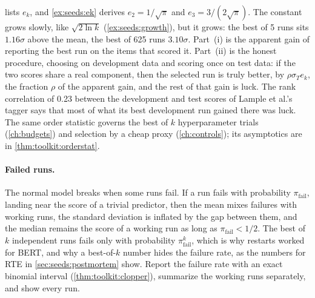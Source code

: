 \begin{refsection}
 lists $e_k$, and \cref{ex:seeds:ek} derives $e_2=1/\sqrt\pi$ and $e_3=3/(2\sqrt\pi)$. The constant grows slowly, like $\sqrt{2\ln k}$ (\cref{ex:seeds:growth}), but it grows: the best of 5 runs sits $1.16\sigma$ above the mean, the best of 625 runs $3.10\sigma$. Part~(i) is the apparent gain of reporting the best run on the items that scored it. Part~(ii) is the honest procedure, choosing on development data and scoring once on test data: if the two scores share a real component, then the selected run is truly better, by $\rho\sigma_Te_k$, the fraction $\rho$ of the apparent gain, and the rest of that gain is luck. The rank correlation of 0.23 between the development and test scores of Lample et al.'s tagger says that most of what its best development run gained there was luck. The same order statistic governs the best of $k$ hyperparameter trials (\cref{ch:budgets}) and selection by a cheap proxy (\cref{ch:controls}); its asymptotics are in \cref{thm:toolkit:orderstat}.

\paragraph{Failed runs.} The normal model breaks when some runs fail. If a run fails with probability $\pi_{\mathrm{fail}}$, landing near the score of a trivial predictor, then the mean mixes failures with working runs, the standard deviation is inflated by the gap between them, and the median remains the score of a working run as long as $\pi_{\mathrm{fail}}<1/2$. The best of $k$ independent runs fails only with probability $\pi_{\mathrm{fail}}^k$, which is why restarts worked for BERT, and why a best-of-$k$ number hides the failure rate, as the numbers for RTE in \cref{sec:seeds:postmortem} show. Report the failure rate with an exact binomial interval (\cref{thm:toolkit:clopper}), summarize the working runs separately, and show every run.


\end{refsection}
